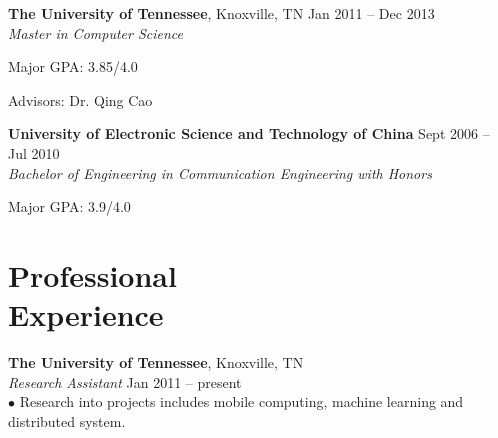 \documentclass[margin, centered]{resume}
\begin{document}
\begin{resume}
    \textbf{The University of Tennessee}, Knoxville, TN \hfill Jan 2011 -- Dec 2013\vspace{0mm}\\\vspace{0mm}%
    \emph{Master in Computer Science} \vspace{-1mm}\\\vspace{-2mm}%
    \begin{list2}
        \item Major GPA: 3.85/4.0
        \item Advisors:  Dr. Qing Cao
    \end{list2}\vspace{-1mm}
    \textbf{University of Electronic Science and Technology of China} \hfill Sept 2006 -- Jul 2010\vspace{0mm}\\\vspace{0mm}%
	\emph{Bachelor of Engineering in Communication Engineering with Honors} \vspace{-1mm}\\\vspace{-2mm}%
	\begin{list2}
		\item Major GPA: 3.9/4.0
	\end{list2}\vspace{-1mm}

    \section{\mysidestyle Professional\\Experience}

    \textbf{The University of Tennessee}, Knoxville, TN \\\vspace{0mm}%
    \emph{Research Assistant} \hfill Jan 2011 -- present\vspace{0mm}\\
    $\bullet$ Research into projects includes mobile computing, machine learning and distributed system.\vspace{-6mm}\\


\end{resume}
\end{document}
